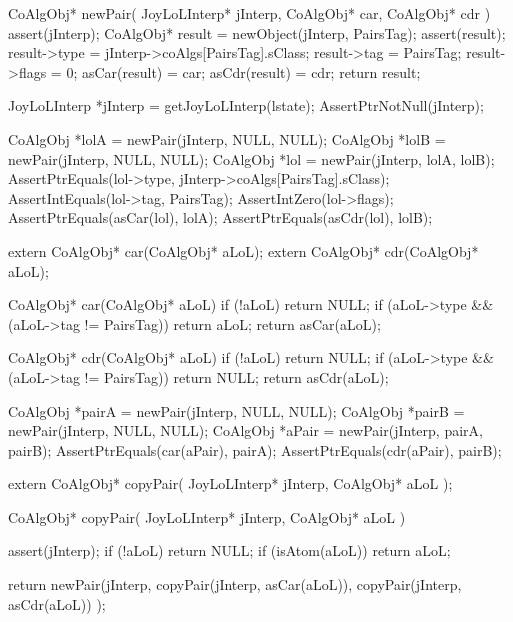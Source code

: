 \startCCode
CoAlgObj* newPair(
  JoyLoLInterp* jInterp,
  CoAlgObj* car,
  CoAlgObj* cdr
) {
  assert(jInterp);
  CoAlgObj* result = newObject(jInterp, PairsTag);
  assert(result);
  result->type  = jInterp->coAlgs[PairsTag].sClass;
  result->tag   = PairsTag;
  result->flags = 0;
  asCar(result) = car;
  asCdr(result) = cdr;
  return result;
}
\stopCCode


\startCTest
  JoyLoLInterp *jInterp = getJoyLoLInterp(lstate);
  AssertPtrNotNull(jInterp);
  
  CoAlgObj *lolA = newPair(jInterp, NULL, NULL);
  CoAlgObj *lolB = newPair(jInterp, NULL, NULL);
  CoAlgObj *lol  = newPair(jInterp, lolA, lolB);
  AssertPtrEquals(lol->type, jInterp->coAlgs[PairsTag].sClass);
  AssertIntEquals(lol->tag, PairsTag);
  AssertIntZero(lol->flags);
  AssertPtrEquals(asCar(lol), lolA);
  AssertPtrEquals(asCdr(lol), lolB);  
\stopCTest
\stopTestCase
\stopTestSuite


\startCHeader
extern CoAlgObj* car(CoAlgObj* aLoL);
extern CoAlgObj* cdr(CoAlgObj* aLoL);
\stopCHeader

\startCCode
CoAlgObj* car(CoAlgObj* aLoL) {
  if (!aLoL) return NULL;
  if (aLoL->type && (aLoL->tag != PairsTag)) return aLoL;
  return asCar(aLoL);
}

CoAlgObj* cdr(CoAlgObj* aLoL) {
  if (!aLoL) return NULL;
  if (aLoL->type && (aLoL->tag != PairsTag)) return NULL;
  return asCdr(aLoL);
}
\stopCCode


\startCTest
  CoAlgObj *pairA = newPair(jInterp, NULL, NULL);
  CoAlgObj *pairB = newPair(jInterp, NULL, NULL);
  CoAlgObj *aPair = newPair(jInterp, pairA, pairB);
  AssertPtrEquals(car(aPair), pairA);
  AssertPtrEquals(cdr(aPair), pairB);
\stopCTest
\stopTestCase
\stopTestSuite

\startTestSuite[copyPair]

\startCHeader
extern CoAlgObj* copyPair(
  JoyLoLInterp* jInterp,
  CoAlgObj* aLoL
);
\stopCHeader

\startCCode
CoAlgObj* copyPair(
  JoyLoLInterp* jInterp,
  CoAlgObj* aLoL
) {
  assert(jInterp);
  if (!aLoL) return NULL;
  if (isAtom(aLoL)) return aLoL;

  return newPair(jInterp,
                 copyPair(jInterp, asCar(aLoL)),
                 copyPair(jInterp, asCdr(aLoL))
                 );
}
\stopCCode

